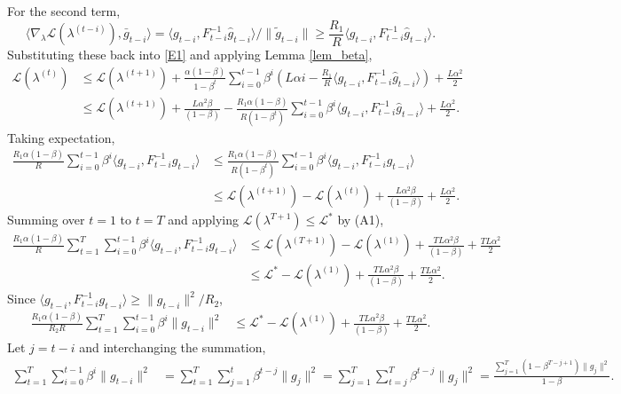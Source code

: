 \documentclass{statsoc}
\newcommand\mL{{\mathcal{L}}}
\begin{document}
For the second term,
\[
\langle \nabla_\lambda \mL(\lambda^{(t-i)}), \bar{g}_{t-i} \rangle 
= \langle g_{t-i}, F_{t-i}^{-1}\widehat{g}_{t-i} \rangle/\|\widetilde{g}_{t-i} \|
\geq \frac{R_1}{R}  \langle g_{t-i}, F_{t-i}^{-1}\widehat{g}_{t-i} \rangle.
\]
Substituting these back into \eqref{E1} and applying Lemma \ref{lem_beta},   
\begin{align*}
\mL(\lambda^{(t)}) & \leq \mL(\lambda^{(t+1)}) + \frac{\alpha (1-\beta)}{1-\beta^t} \sum_{i=0}^{t-1} \beta^i \left( L\alpha i - \frac{R_1}{R}\langle g_{t-i}, F_{t-i}^{-1}\widehat{g}_{t-i} \rangle \right) + \frac{L \alpha^2}{2} \\ 
& \leq \mL(\lambda^{(t+1)}) + \frac{L\alpha ^2 \beta }{(1-\beta)} - \frac{R_1 \alpha (1-\beta)}{R(1-\beta^t)} \sum_{i=0}^{t-1} \beta^i\langle g_{t-i}, F_{t-i}^{-1}\widehat{g}_{t-i} \rangle + \frac{L \alpha^2}{2}.
\end{align*}
Taking expectation,
\[
\begin{aligned}
 \frac{R_1 \alpha (1-\beta)}{R} \sum_{i=0}^{t-1} \beta^i \langle g_{t-i}, F_{t-i}^{-1} g_{t-i} \rangle 
&\leq  \frac{R_1 \alpha (1-\beta)}{R(1-\beta^t)} \sum_{i=0}^{t-1} \beta^i \langle g_{t-i}, F_{t-i}^{-1} g_{t-i} \rangle \\
&\leq \mL(\lambda^{(t+1)}) - \mL(\lambda^{(t)}) + \frac{L\alpha ^2 \beta }{(1-\beta)}  + \frac{L \alpha^2}{2}.
\end{aligned}
\]
Summing over $t=1$ to $t=T$ and applying $\mL(\lambda^{T+1}) \leq \mL^*$ by (A1),
\[
\begin{aligned}
 \frac{R_1 \alpha (1-\beta)}{R} \sum_{t=1}^T \sum_{i=0}^{t-1} \beta^i \langle g_{t-i}, F_{t-i}^{-1} g_{t-i} \rangle 
&\leq \mL(\lambda^{(T+1)}) - \mL(\lambda^{(1)}) + \frac{TL\alpha ^2 \beta }{(1-\beta)}  + \frac{TL \alpha^2}{2} \\
&\leq \mL^* - \mL(\lambda^{(1)}) + \frac{TL\alpha ^2 \beta }{(1-\beta)}  + \frac{TL \alpha^2}{2}.
\end{aligned}
\]
Since $\langle g_{t-i}, F_{t-i}^{-1} g_{t-i} \rangle\geq \|g_{t-i}\|^2/R_2$,
\[
\begin{aligned}
 \frac{R_1 \alpha (1-\beta)}{R_2 R} \sum_{t=1}^T \sum_{i=0}^{t-1} \beta^i \|g_{t-i}\|^2 
&\leq \mL^* - \mL(\lambda^{(1)}) + \frac{TL\alpha ^2 \beta }{(1-\beta)}  + \frac{TL \alpha^2}{2}.
\end{aligned}
\]
Let $j = t-i$ and interchanging the summation,
\begin{align*}
 \sum_{t=1}^T \sum_{i=0}^{t-1} \beta^i \| g_{t-i} \|^2
&= \sum_{t=1}^T \sum_{j=1}^t \beta^{t-j} \| g_{j} \|^2  
= \sum_{j=1}^T \sum_{t=j}^T \beta^{t-j} \| g_{j} \|^2  
= \frac{\sum_{j=1}^T (1-\beta^{T-j+1})\| g_{j} \|^2}{1-\beta}.
\end{align*}
\end{document}
